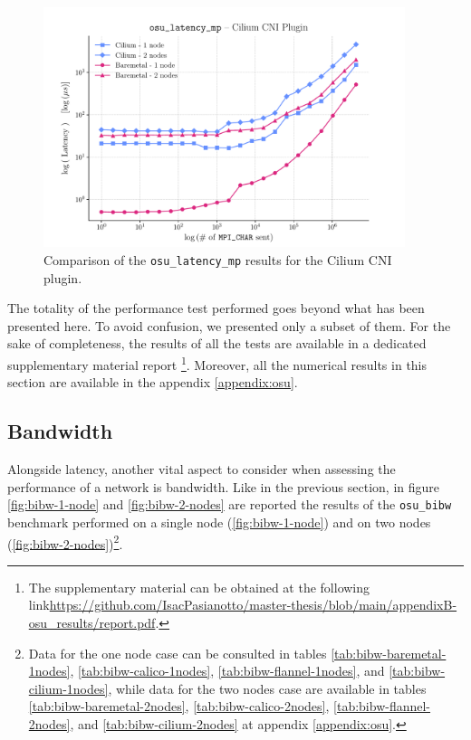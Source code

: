 \begin{figure}
  \centering
  \includegraphics[width=0.94\textwidth]{img/chpt3/cilium-latency_mp}
  \caption{Comparison of the \texttt{osu\_latency\_mp} results for the Cilium
    CNI plugin.}
  \label{fig:cilium-latency}
\end{figure}

The totality of the performance test performed goes beyond what has been
presented here. To avoid confusion, we presented only a subset of them. For the
sake of completeness, the results of all the tests are available in a dedicated
supplementary material report \footnote{ The supplementary material can be
obtained at the following
link\url{https://github.com/IsacPasianotto/master-thesis/blob/main/appendixB-osu_results/report.pdf}.}.
Moreover, all the numerical results in this section are available in the
appendix \ref{appendix:osu}.

\clearpage

\subsection{Bandwidth}\label{subsec:results-bandwidth}

Alongside latency, another vital aspect to consider when assessing the
performance of a network is bandwidth.
Like in the previous section, in figure \ref{fig:bibw-1-node} and
\ref{fig:bibw-2-nodes} are reported the results of the \texttt{osu\_bibw}
benchmark performed on a single node (\ref{fig:bibw-1-node}) and on two nodes
(\ref{fig:bibw-2-nodes})\footnote{
  Data for the one node case can be consulted in
  tables \ref{tab:bibw-baremetal-1nodes}, \ref{tab:bibw-calico-1nodes},
  \ref{tab:bibw-flannel-1nodes}, and \ref{tab:bibw-cilium-1nodes}, while data
  for the two nodes case are available in tables
  \ref{tab:bibw-baremetal-2nodes}, \ref{tab:bibw-calico-2nodes},
  \ref{tab:bibw-flannel-2nodes}, and \ref{tab:bibw-cilium-2nodes} at appendix
  \ref{appendix:osu}.
}.

